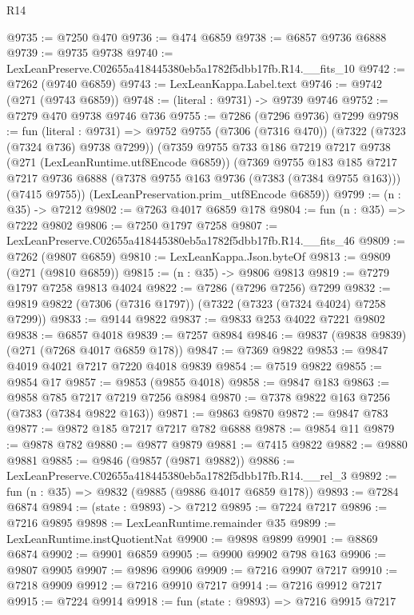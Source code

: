 \begin{lexlean}{R14}
\begin{coremodule}
@9735 := @7250 @470
@9736 := @474 @6859
@9738 := @6857 @9736 @6888
@9739 := @9735 @9738
@9740 := LexLeanPreserve.C02655a418445380eb5a1782f5dbb17fb.R14.__fits_10
@9742 := @7262 (@9740 @6859)
@9743 := LexLeanKappa.Label.text
@9746 := @9742 (@271 (@9743 @6859))
@9748 := (literal : @9731) -> @9739 @9746
@9752 := @7279 @470 @9738 @9746 @736
@9755 := @7286 (@7296 @9736) @7299
@9798 := fun (literal : @9731) =>
  @9752
    @9755
    (@7306 (@7316 @470))
    (@7322 (@7323 (@7324 @736) @9738 @7299))
    (@7359
      @9755
      @733
      @186
      @7219
      @7217
      @9738
      (@271 (LexLeanRuntime.utf8Encode @6859))
      (@7369
        @9755
        @183
        @185
        @7217
        @7217
        @9736
        @6888
        (@7378 @9755 @163 @9736 (@7383 (@7384 @9755 @163)))
        (@7415 @9755))
      (LexLeanPreservation.prim_utf8Encode @6859))
@9799 := (n : @35) -> @7212
@9802 := @7263 @4017 @6859 @178
@9804 := fun (n : @35) => @7222 @9802
@9806 := @7250 @1797 @7258
@9807 := LexLeanPreserve.C02655a418445380eb5a1782f5dbb17fb.R14.__fits_46
@9809 := @7262 (@9807 @6859)
@9810 := LexLeanKappa.Json.byteOf
@9813 := @9809 (@271 (@9810 @6859))
@9815 := (n : @35) -> @9806 @9813
@9819 := @7279 @1797 @7258 @9813 @4024
@9822 := @7286 (@7296 @7256) @7299
@9832 := @9819 @9822 (@7306 (@7316 @1797)) (@7322 (@7323 (@7324 @4024) @7258 @7299))
@9833 := @9144 @9822
@9837 := @9833 @253 @4022 @7221 @9802
@9838 := @6857 @4018
@9839 := @7257 @8984
@9846 := @9837 (@9838 @9839) (@271 (@7268 @4017 @6859 @178))
@9847 := @7369 @9822
@9853 := @9847 @4019 @4021 @7217 @7220 @4018 @9839
@9854 := @7519 @9822
@9855 := @9854 @17
@9857 := @9853 (@9855 @4018)
@9858 := @9847 @183
@9863 := @9858 @785 @7217 @7219 @7256 @8984
@9870 := @7378 @9822 @163 @7256 (@7383 (@7384 @9822 @163))
@9871 := @9863 @9870
@9872 := @9847 @783
@9877 := @9872 @185 @7217 @7217 @782 @6888
@9878 := @9854 @11
@9879 := @9878 @782
@9880 := @9877 @9879
@9881 := @7415 @9822
@9882 := @9880 @9881
@9885 := @9846 (@9857 (@9871 @9882))
@9886 := LexLeanPreserve.C02655a418445380eb5a1782f5dbb17fb.R14.__rel_3
@9892 := fun (n : @35) => @9832 (@9885 (@9886 @4017 @6859 @178))
@9893 := @7284 @6874
@9894 := (state : @9893) -> @7212
@9895 := @7224 @7217
@9896 := @7216 @9895
@9898 := LexLeanRuntime.remainder @35
@9899 := LexLeanRuntime.instQuotientNat
@9900 := @9898 @9899
@9901 := @8869 @6874
@9902 := @9901 @6859
@9905 := @9900 @9902 @798 @163
@9906 := @9807 @9905
@9907 := @9896 @9906
@9909 := @7216 @9907 @7217
@9910 := @7218 @9909
@9912 := @7216 @9910 @7217
@9914 := @7216 @9912 @7217
@9915 := @7224 @9914
@9918 := fun (state : @9893) => @7216 @9915 @7217

\end{coremodule}
\end{lexlean}
